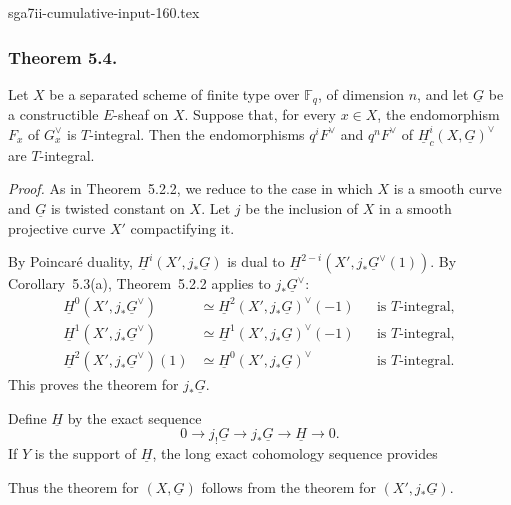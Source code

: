 \begin{filecontents*}{sga7ii-cumulative-input-160.tex}
\subsubsection*{Theorem 5.4.}
Let $X$ be a separated scheme of finite type over $\mathbb F_q$, of
dimension $n$, and let $\underline G$ be a constructible $E$-sheaf on $X$.
Suppose that, for every $x\in X$, the endomorphism $F_x$ of
$G_x^\vee$ is $T$-integral.  Then the endomorphisms $q^iF^\vee$ and
$q^nF^\vee$ of $\underline H_c^i(X,\underline G)^\vee$ are $T$-integral.

\medskip
\noindent\emph{Proof.}
As in Theorem~5.2.2, we reduce to the case in which $X$ is a smooth curve
and $\underline G$ is twisted constant on $X$.  Let $j$ be the inclusion of
$X$ in a smooth projective curve $X'$ compactifying it.

By Poincar\'e duality,
$\underline H^i(X',j_*\underline G)$ is dual to
$\underline H^{2-i}(X',j_*\underline G^\vee(1))$.  By Corollary~5.3(a),
Theorem~5.2.2 applies to $j_*\underline G^\vee$:
\begin{align*}
\underline H^0(X',j_*\underline G^\vee)
  &\simeq \underline H^2(X',j_*\underline G)^\vee(-1)
  &&\text{is \(T\)-integral},\\
\underline H^1(X',j_*\underline G^\vee)
  &\simeq \underline H^1(X',j_*\underline G)^\vee(-1)
  &&\text{is \(T\)-integral},\\
\underline H^2(X',j_*\underline G^\vee)(1)
  &\simeq \underline H^0(X',j_*\underline G)^\vee
  &&\text{is \(T\)-integral}.
\end{align*}
This proves the theorem for $j_*\underline G$.

Define $\underline H$ by the exact sequence
\[
0\longrightarrow j_!\underline G\longrightarrow j_*\underline G
\longrightarrow\underline H\longrightarrow0.
\]
If $Y$ is the support of $\underline H$, the long exact cohomology sequence
provides
\begin{center}
\end{center}
Thus the theorem for $(X,\underline G)$ follows from the theorem for
$(X',j_*\underline G)$.
\end{filecontents*}
